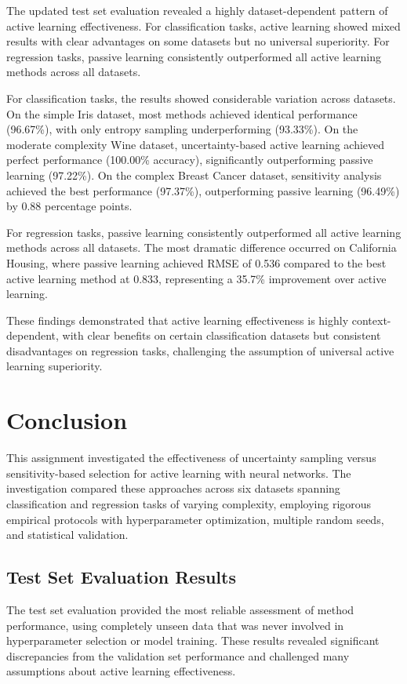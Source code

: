 \documentclass[conference]{IEEEtran}
\begin{document}
The updated test set evaluation revealed a highly dataset-dependent pattern of active learning effectiveness. For classification tasks, active learning showed mixed results with clear advantages on some datasets but no universal superiority. For regression tasks, passive learning consistently outperformed all active learning methods across all datasets.

For classification tasks, the results showed considerable variation across datasets. On the simple Iris dataset, most methods achieved identical performance (96.67\%), with only entropy sampling underperforming (93.33\%). On the moderate complexity Wine dataset, uncertainty-based active learning achieved perfect performance (100.00\% accuracy), significantly outperforming passive learning (97.22\%). On the complex Breast Cancer dataset, sensitivity analysis achieved the best performance (97.37\%), outperforming passive learning (96.49\%) by 0.88 percentage points.

For regression tasks, passive learning consistently outperformed all active learning methods across all datasets. The most dramatic difference occurred on California Housing, where passive learning achieved RMSE of 0.536 compared to the best active learning method at 0.833, representing a 35.7\% improvement over active learning.

These findings demonstrated that active learning effectiveness is highly context-dependent, with clear benefits on certain classification datasets but consistent disadvantages on regression tasks, challenging the assumption of universal active learning superiority.

\section{Conclusion}

This assignment investigated the effectiveness of uncertainty sampling versus sensitivity-based selection for active learning with neural networks. The investigation compared these approaches across six datasets spanning classification and regression tasks of varying complexity, employing rigorous empirical protocols with hyperparameter optimization, multiple random seeds, and statistical validation.

\subsection{Test Set Evaluation Results}

The test set evaluation provided the most reliable assessment of method performance, using completely unseen data that was never involved in hyperparameter selection or model training. These results revealed significant discrepancies from the validation set performance and challenged many assumptions about active learning effectiveness.
\end{document}
